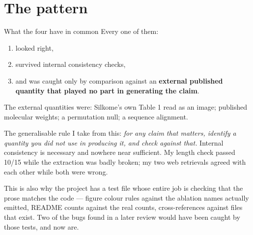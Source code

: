 \section{The pattern}

\begin{keybox}{What the four have in common}
Every one of them:
\begin{enumerate}[leftmargin=*,itemsep=2pt]
  \item looked right,
  \item survived internal consistency checks,
  \item and was caught only by comparison against an \textbf{external published
        quantity that played no part in generating the claim}.
\end{enumerate}

The external quantities were: Silkome's own Table 1 read as an image; published
molecular weights; a permutation null; a sequence alignment.

The generalisable rule I take from this: \emph{for any claim that matters,
identify a quantity you did not use in producing it, and check against that.}
Internal consistency is necessary and nowhere near sufficient. My length check
passed 10/15 while the extraction was badly broken; my two web retrievals agreed
with each other while both were wrong.
\end{keybox}

This is also why the project has a test file whose entire job is checking that
the prose matches the code --- figure colour rules against the ablation names
actually emitted, README counts against the real counts, cross-references
against files that exist. Two of the bugs found in a later review would have
been caught by those tests, and now are.
